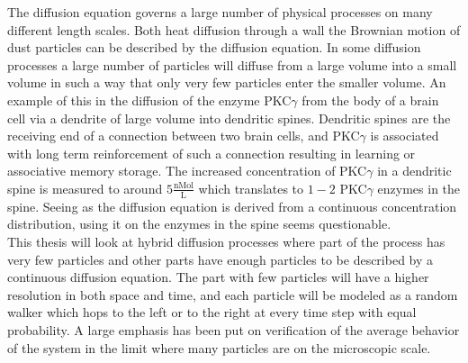 The diffusion equation governs a large number of physical processes on many different length scales. 
Both heat diffusion through a wall the Brownian motion of dust particles can be described by the diffusion equation. 
In some diffusion processes a large number of particles will diffuse from a large volume into a small volume in such a way that only very few particles enter the smaller volume. 
An example of this in the diffusion of the enzyme PKC$\gamma$ from the body of a brain cell via a dendrite of large volume into dendritic spines. 
Dendritic spines are the receiving end of a connection between two brain cells, and PKC$\gamma$ is associated with long term reinforcement of such a connection resulting in learning or associative memory storage. 
The increased concentration of PKC$\gamma$ in a dendritic spine is measured to around $5\frac{\text{nMol}}{\text{L}}$ which translates to $1-2$ PKC$\gamma$ enzymes in the spine. 
Seeing as the diffusion equation is derived from a continuous concentration distribution, using it on the enzymes in the spine seems questionable. \\

This thesis will look at hybrid diffusion processes where part of the process has very few particles and other parts have enough particles to be described by a continuous diffusion equation. 
The part with few particles will have a higher resolution in both space and time, and each particle will be modeled as a random walker which hops to the left or to the right at every time step with equal probability. 
A large emphasis has been put on verification of the average behavior of the system in the limit where many particles are on the microscopic scale.